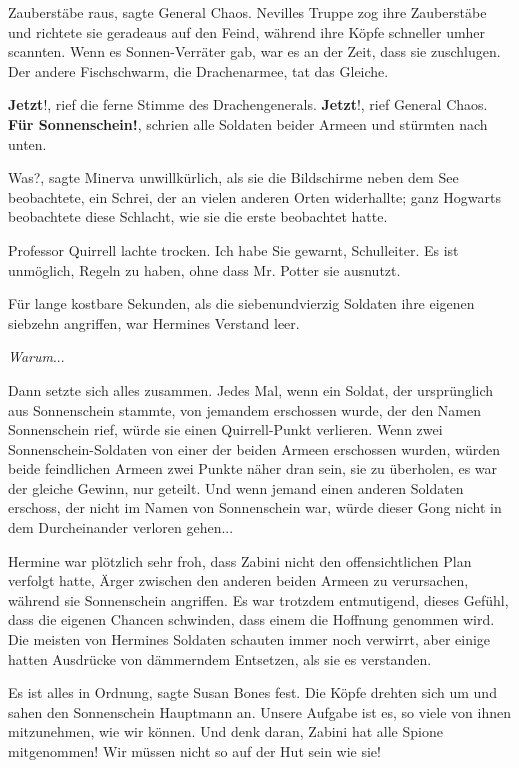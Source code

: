 \glqq{}Zauberstäbe raus\grqq{}, sagte General Chaos. Nevilles Truppe zog ihre
Zauberstäbe und richtete sie geradeaus auf den Feind, während ihre Köpfe
schneller umher scannten. Wenn es Sonnen-Verräter gab, war es an der Zeit, dass
sie zuschlugen. Der andere Fischschwarm, die Drachenarmee, tat das Gleiche.

\glqq{}\textbf{Jetzt}!\grqq{}, rief die ferne Stimme des Drachengenerals. \glqq{}
\textbf{Jetzt}!\grqq{}, rief General Chaos. \glqq{}\textbf{Für
Sonnenschein!}\grqq{}, schrien alle Soldaten beider Armeen und stürmten nach
unten.

\glqq{}Was?\grqq{}, sagte Minerva unwillkürlich, als sie die Bildschirme neben
dem See beobachtete, ein Schrei, der an vielen anderen Orten widerhallte; ganz
Hogwarts beobachtete diese Schlacht, wie sie die erste beobachtet hatte.

Professor Quirrell lachte trocken. \glqq{}Ich habe Sie gewarnt, Schulleiter. Es
ist unmöglich, Regeln zu haben, ohne dass Mr. Potter sie ausnutzt.\grqq{}

Für lange kostbare Sekunden, als die siebenundvierzig Soldaten ihre eigenen
siebzehn angriffen, war Hermines Verstand leer.

\emph{Warum}...

Dann setzte sich alles zusammen. Jedes Mal, wenn ein Soldat, der ursprünglich
aus Sonnenschein stammte, von jemandem erschossen wurde, der den Namen
Sonnenschein rief, würde sie einen Quirrell-Punkt verlieren. Wenn zwei
Sonnenschein-Soldaten von einer der beiden Armeen erschossen wurden, würden
beide feindlichen Armeen zwei Punkte näher dran sein, sie zu überholen, es war
der gleiche Gewinn, nur geteilt. Und wenn jemand einen anderen Soldaten
erschoss, der nicht im Namen von Sonnenschein war, würde dieser Gong nicht in
dem Durcheinander verloren gehen...

Hermine war plötzlich sehr froh, dass Zabini nicht den offensichtlichen Plan
verfolgt hatte, Ärger zwischen den anderen beiden Armeen zu verursachen, während
sie Sonnenschein angriffen. Es war trotzdem entmutigend, dieses Gefühl, dass die
eigenen Chancen schwinden, dass einem die Hoffnung genommen wird. Die meisten
von Hermines Soldaten schauten immer noch verwirrt, aber einige hatten Ausdrücke
von dämmerndem Entsetzen, als sie es verstanden.

\glqq{}Es ist alles in Ordnung\grqq{}, sagte Susan Bones fest. Die Köpfe drehten
sich um und sahen den Sonnenschein Hauptmann an. \glqq{}Unsere Aufgabe ist es, so
viele von ihnen mitzunehmen, wie wir können. Und denk daran, Zabini hat alle
Spione mitgenommen! Wir müssen nicht so auf der Hut sein wie sie!\grqq{}

